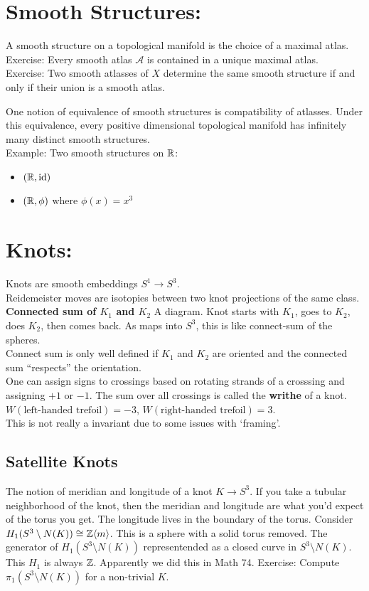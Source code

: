 \documentclass[12pt]{article}
\begin{document}


\section{Smooth Structures:}
A smooth structure on a topological manifold is the choice of a maximal atlas. \\
Exercise: Every smooth atlas $\mathcal{A}$ is contained in a unique maximal atlas. \\
Exercise: Two smooth atlasses of $X$ determine the same smooth structure if and only if their union is a smooth atlas. \bbni

One notion of equivalence of smooth structures is compatibility of atlasses. Under this equivalence, every positive dimensional topological manifold has infinitely many distinct smooth structures. \\
Example: Two smooth structures on $\mathbb R$:
\begin{itemize}
    \item $(\mathbb R, \operatorname{id})$
    \item $(\mathbb R, \phi)$ where $\phi(x) = x^3$
\end{itemize}

\section{Knots:}
Knots are smooth embeddings $S^1 \to S^3$. \\
Reidemeister moves are isotopies between two knot projections of the same class. \\
\textbf{Connected sum of $K_1$ and $K_2$} A diagram. Knot starts with $K_1$, goes to $K_2$, does $K_2$, then comes back. As maps into $S^3$, this is like connect-sum of the spheres. \\
Connect sum is only well defined if $K_1$ and $K_2$ are oriented and the connected sum ``respects'' the orientation. \\
One can assign signs to crossings based on rotating strands of a crosssing and assigning $+1$ or $-1$. The sum over all crossings is called the \textbf{writhe} of a knot. \\
$W(\text{left-handed trefoil}) = -3$, $W(\text{right-handed trefoil}) = 3$. \\
This is not really a invariant due to some issues with `framing'. \bbni
\subsection{Satellite Knots}
The notion of meridian and longitude of a knot $K \to S^3$. If you take a tubular neighborhood of the knot, then the meridian and longitude are what you'd expect of the torus you get. The longitude lives in the boundary of the torus. \bbni
Consider $H_1(S^3 \setminus N(K)) \cong \mathbb Z\langle m\rangle$. This is a sphere with a solid torus removed. The generator of $H_1(S^3\setminus N(K))$ representended as a closed curve in $S^3 \setminus N(K)$. This $H_1$ is always $\mathbb Z$. Apparently we did this in Math 74. \bbni
Exercise: Compute $\pi_1(S^3 \setminus N(K))$ for a non-trivial $K$. \bbni
\end{document}
